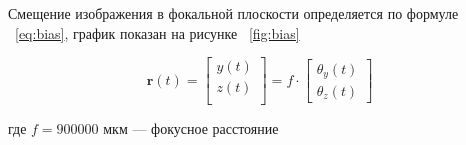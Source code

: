 \begin{samepage}
Смещение изображения в фокальной плоскости определяется по формуле ~\eqref{eq:bias}, график показан на рисунке ~\ref{fig:bias}

\begin{equation}
	\label{eq:bias}
	\mathbf{r}(t) = 
	\begin{bmatrix}
		y(t) \\
		z(t) \\
	\end{bmatrix}
	= f \cdot
	\begin{bmatrix}
		\theta_{y}(t) \\
		\theta_{z}(t)
	\end{bmatrix}
\end{equation}

где \(f=900000\) мкм --- фокусное расстояние
\end{samepage}

